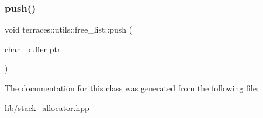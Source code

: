 \subsubsection{\texorpdfstring{push()}{push()}}
{\footnotesize\ttfamily void terraces\+::utils\+::free\+\_\+list\+::push (\begin{DoxyParamCaption}\item[{\hyperlink{namespaceterraces_1_1utils_a899529841c01a7e7152ac5ef8496c024}{char\+\_\+buffer}}]{ptr }\end{DoxyParamCaption})\hspace{0.3cm}{\ttfamily [inline]}}



The documentation for this class was generated from the following file\+:\begin{DoxyCompactItemize}
\item 
lib/\hyperlink{stack__allocator_8hpp}{stack\+\_\+allocator.\+hpp}\end{DoxyCompactItemize}
